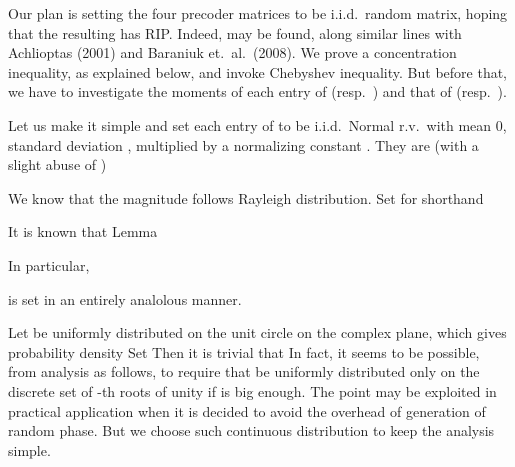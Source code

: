 \startsection [title={Confirming Restricted Isometry of Beamformer}]
\startsubsection [title={Design of Digital Beamformer Entries}]

Our plan is setting the four precoder matrices to be i.i.d.\ random matrix, hoping that the resulting  has RIP.
Indeed,  may be found, along similar lines with Achlioptas (2001) and Baraniuk et.\ al.\ (2008).
We prove a concentration inequality, as explained below, and invoke Chebyshev inequality.
But before that, we have to investigate the moments of each entry of  (resp.\ ) and that of  (resp.\ ).

Let us make it simple and set each entry of  to be i.i.d.\ Normal r.v.\ with mean 0, standard deviation , multiplied by a normalizing constant .
They are (with a slight abuse of )

We know that the magnitude  follows Rayleigh distribution.
Set for shorthand

It is known that
\Result
{Lemma}
{
}

In particular,

 is set in an entirely analolous manner.

\stopsubsection

\startsubsection [title={Design of Analog Beamformer Entries}]

Let  be uniformly distributed on the unit circle on the complex plane, which gives probability density
Set
Then it is trivial that
In fact, it seems to be possible, from analysis as follows, to require that  be uniformly distributed only on the discrete set of -th roots of unity if  is big enough.
The point may be exploited in practical application when it is decided to avoid the overhead of generation of random phase.
But we choose such continuous distribution to keep the analysis simple.

